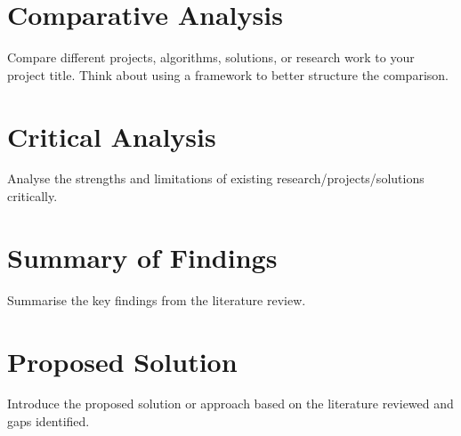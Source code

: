 \section{Comparative Analysis}
Compare different projects, algorithms, solutions, or research work to your project title. Think about using a framework to better structure the comparison.

\section{Critical Analysis}
Analyse the strengths and limitations of existing research/projects/solutions critically.

\section{Summary of Findings}
Summarise the key findings from the literature review.

\section{Proposed Solution}
Introduce the proposed solution or approach based on the literature reviewed and gaps identified.
